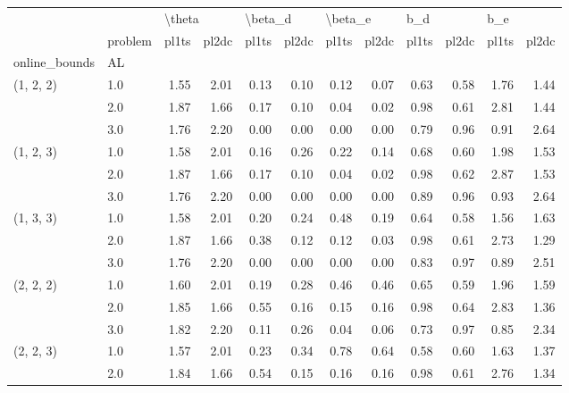 \begin{tabular}{llrrrrrrrrrr}
\toprule
          & {} & \multicolumn{2}{l}{\textbackslash theta} & \multicolumn{2}{l}{\textbackslash beta\_d} & \multicolumn{2}{l}{\textbackslash beta\_e} & \multicolumn{2}{l}{b\_d} & \multicolumn{2}{l}{b\_e} \\
          & problem &  pl1ts & pl2dc &   pl1ts & pl2dc &   pl1ts & pl2dc & pl1ts & pl2dc & pl1ts & pl2dc \\
online\_bounds & AL &        &       &         &       &         &       &       &       &       &       \\
\midrule
(1, 2, 2) & 1.0 &   1.55 &  2.01 &    0.13 &  0.10 &    0.12 &  0.07 &  0.63 &  0.58 &  1.76 &  1.44 \\
          & 2.0 &   1.87 &  1.66 &    0.17 &  0.10 &    0.04 &  0.02 &  0.98 &  0.61 &  2.81 &  1.44 \\
          & 3.0 &   1.76 &  2.20 &    0.00 &  0.00 &    0.00 &  0.00 &  0.79 &  0.96 &  0.91 &  2.64 \\
(1, 2, 3) & 1.0 &   1.58 &  2.01 &    0.16 &  0.26 &    0.22 &  0.14 &  0.68 &  0.60 &  1.98 &  1.53 \\
          & 2.0 &   1.87 &  1.66 &    0.17 &  0.10 &    0.04 &  0.02 &  0.98 &  0.62 &  2.87 &  1.53 \\
          & 3.0 &   1.76 &  2.20 &    0.00 &  0.00 &    0.00 &  0.00 &  0.89 &  0.96 &  0.93 &  2.64 \\
(1, 3, 3) & 1.0 &   1.58 &  2.01 &    0.20 &  0.24 &    0.48 &  0.19 &  0.64 &  0.58 &  1.56 &  1.63 \\
          & 2.0 &   1.87 &  1.66 &    0.38 &  0.12 &    0.12 &  0.03 &  0.98 &  0.61 &  2.73 &  1.29 \\
          & 3.0 &   1.76 &  2.20 &    0.00 &  0.00 &    0.00 &  0.00 &  0.83 &  0.97 &  0.89 &  2.51 \\
(2, 2, 2) & 1.0 &   1.60 &  2.01 &    0.19 &  0.28 &    0.46 &  0.46 &  0.65 &  0.59 &  1.96 &  1.59 \\
          & 2.0 &   1.85 &  1.66 &    0.55 &  0.16 &    0.15 &  0.16 &  0.98 &  0.64 &  2.83 &  1.36 \\
          & 3.0 &   1.82 &  2.20 &    0.11 &  0.26 &    0.04 &  0.06 &  0.73 &  0.97 &  0.85 &  2.34 \\
(2, 2, 3) & 1.0 &   1.57 &  2.01 &    0.23 &  0.34 &    0.78 &  0.64 &  0.58 &  0.60 &  1.63 &  1.37 \\
          & 2.0 &   1.84 &  1.66 &    0.54 &  0.15 &    0.16 &  0.16 &  0.98 &  0.61 &  2.76 &  1.34 \\

\end{tabular}
